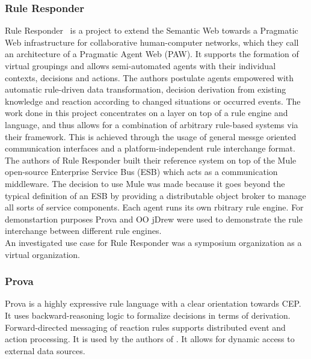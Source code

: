 \documentclass[11pt]{article}%
\begin{document}
\subsubsection{Rule Responder}
Rule Responder~\cite{2007-Paschke_etal-RuleResponder.pdf} is a project to extend the Semantic Web towards a Pragmatic Web infrastructure for collaborative human-computer networks, which they call an architecture of a Pragmatic Agent Web (PAW). It supports the formation of virtual groupings and allows semi-automated agents with their individual contexts, decisions and actions. The authors postulate agents empowered with automatic rule-driven data transformation, decision derivation from existing knowledge and reaction according to changed situations or occurred events. The work done in this project concentrates on a layer on top of a rule engine and language, and thus allows for a combination of arbitrary rule-based systems via their framework. This is achieved through the usage of general messge oriented communication interfaces and a platform-independent rule interchange format.
\\
The authors of Rule Responder built their reference system on top of the Mule~\cite{wwwmuleesb} open-source Enterprise Service Bus (ESB) which acts as a communication middleware. The decision to use Mule was made because it goes beyond the typical definition of an ESB by providing a distributable object broker to manage all sorts of service components. Each agent runs its own rbitrary rule engine. For demonstartion purposes Prova and OO jDrew were used to demonstrate the rule interchange between different rule engines.
\\
An investigated use case for Rule Responder was a symposium organization as a virtual organization.




\subsubsection{Prova}
Prova is a highly expressive rule language with a clear orientation towards CEP. It uses backward-reasoning logic to formalize decisions in terms of derivation. Forward-directed messaging of reaction rules supports distributed event and action processing. It is used by the authors of \cite{2013_Zhao-Paschke_EDSWE.pdf,2007-Paschke_etal-RuleResponder.pdf}. It allows for dynamic access to external data sources.
\end{document}
